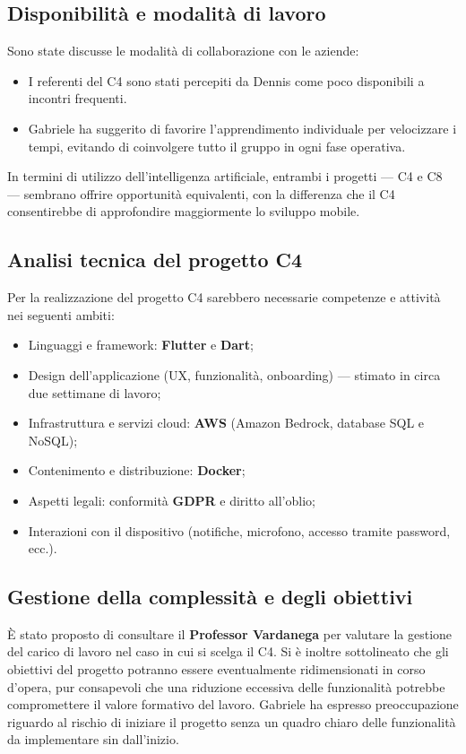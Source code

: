 \documentclass[a4paper,12pt]{article}
\begin{document}
\subsection{Disponibilità e modalità di lavoro}
Sono state discusse le modalità di collaborazione con le aziende:
\begin{itemize}
    \item I referenti del C4 sono stati percepiti da Dennis come poco disponibili a incontri frequenti.
    \item Gabriele ha suggerito di favorire l’apprendimento individuale per velocizzare i tempi, evitando di coinvolgere tutto il gruppo in ogni fase operativa.
\end{itemize}
In termini di utilizzo dell’intelligenza artificiale, entrambi i progetti — C4 e C8 — sembrano offrire opportunità equivalenti, con la differenza che il C4 consentirebbe di approfondire maggiormente lo sviluppo mobile.

\subsection{Analisi tecnica del progetto C4}
Per la realizzazione del progetto C4 sarebbero necessarie competenze e attività nei seguenti ambiti:
\begin{itemize}
    \item Linguaggi e framework: \textbf{Flutter} e \textbf{Dart};
    \item Design dell’applicazione (UX, funzionalità, onboarding) — stimato in circa due settimane di lavoro;
    \item Infrastruttura e servizi cloud: \textbf{AWS} (Amazon Bedrock, database SQL e NoSQL);
    \item Contenimento e distribuzione: \textbf{Docker};
    \item Aspetti legali: conformità \textbf{GDPR} e diritto all’oblio;
    \item Interazioni con il dispositivo (notifiche, microfono, accesso tramite password, ecc.).
\end{itemize}

\subsection{Gestione della complessità e degli obiettivi}
È stato proposto di consultare il \textbf{Professor Vardanega} per valutare la gestione del carico di lavoro nel caso in cui si scelga il C4.  
Si è inoltre sottolineato che gli obiettivi del progetto potranno essere eventualmente ridimensionati in corso d’opera, pur consapevoli che una riduzione eccessiva delle funzionalità potrebbe compromettere il valore formativo del lavoro.  
Gabriele ha espresso preoccupazione riguardo al rischio di iniziare il progetto senza un quadro chiaro delle funzionalità da implementare sin dall’inizio.
\end{document}

